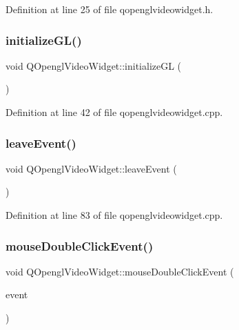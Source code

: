 Definition at line 25 of file qopenglvideowidget.\+h.

\mbox{\label{class_q_opengl_video_widget_a35d303070fbebce4bb907ccbcfb6059c}} 
\subsubsection{\texorpdfstring{initializeGL()}{initializeGL()}}
{\footnotesize\ttfamily void Q\+Opengl\+Video\+Widget\+::initialize\+GL (\begin{DoxyParamCaption}{ }\end{DoxyParamCaption})\hspace{0.3cm}{\ttfamily [protected]}}



Definition at line 42 of file qopenglvideowidget.\+cpp.

\mbox{\label{class_q_opengl_video_widget_afd181aad471752131da2bcb37cf3abc3}} 
\subsubsection{\texorpdfstring{leaveEvent()}{leaveEvent()}}
{\footnotesize\ttfamily void Q\+Opengl\+Video\+Widget\+::leave\+Event (\begin{DoxyParamCaption}\item[{Q\+Event $\ast$}]{ }\end{DoxyParamCaption})\hspace{0.3cm}{\ttfamily [protected]}}



Definition at line 83 of file qopenglvideowidget.\+cpp.

\mbox{\label{class_q_opengl_video_widget_ad38b0422d0b45ec7af1cd0327925c6d4}} 
\subsubsection{\texorpdfstring{mouseDoubleClickEvent()}{mouseDoubleClickEvent()}}
{\footnotesize\ttfamily void Q\+Opengl\+Video\+Widget\+::mouse\+Double\+Click\+Event (\begin{DoxyParamCaption}\item[{Q\+Mouse\+Event $\ast$}]{event }\end{DoxyParamCaption})\hspace{0.3cm}{\ttfamily [protected]}}



